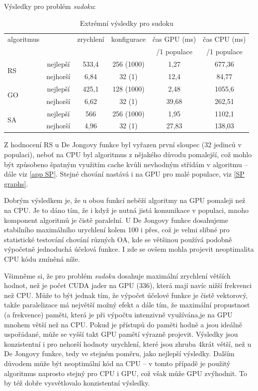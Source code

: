 Výsledky pro problém \emph{sudoku}:

\begin{table}[h]
    \begin{center}
    \begin{tabular}{lccccc}
      \toprule
      algoritmus &  & zrychlení & konfigurace & čas GPU (ms) & čas CPU (ms) \\
      & & & & /1 populace & /1 populace \\
      \midrule
      \multirow{2}{*}{RS} & nejlepší & 533,4 & 256 (1000) & 1,27 & 677,36\\
                        & nejhorší & 6,84 & 32 (1) & 12,4 & 84,77\\
      \multirow{2}{*}{GO} & nejlepší & 425,1 & 128 (1000) & 2,48 & 1055,6\\
                         & nejhorší & 6,62 & 32 (1) & 39,68 & 262,51 \\
      \multirow{2}{*}{SA} & nejlepší & 566 & 256 (1000) & 1,95 & 1102,1\\
                        & nejhorší & 4,96 & 32 (1) & 27,83 & 138,03\\

      \bottomrule
    \end{tabular}
    \caption{Extrémní výsledky pro sudoku}
    \end{center}
\end{table}

Z hodnocení RS u De Jongovy funkce byl vyřazen první sloupec (32 jedinců v populaci), neboť na CPU byl algoritmus z nějakého důvodu pomalejší, což mohlo být způsobeno špatným využitím cache kvůli nevhodným střídám v algoritmu -- dále viz \ref{app SP}. Stejné chování nastává i na GPU pro malé populace, viz \ref{SP graphs}.

Dobrým výsledkem je, že u obou funkcí neběží algoritmy na GPU pomaleji než na CPU. Je to dáno tím, že i když je nutná jistá komunikace v populaci, mnoho komponent algoritmů je čistě paralelní. U De Jongovy funkce dosahujeme stabilního maximálního urychlení kolem 100 i přes, což je velmi slibné pro statistické testování chování různých OA, kde se většinou používá podobně výpočetně jednoduchá účelová funkce. I zde se ovšem mohla projevit neoptimalita CPU kódu zmíněná níže. 

Všimněme si, že pro problém \emph{sudoku} dosahuje maximální zrychlení větších hodnot, než je počet CUDA jader na GPU (336), která mají navíc nižší frekvenci než CPU. Může to být jednak tím, že výpočet účelové funkce je čistě vektorový, takže paralelizace má největší možný efekt a dále tím, že maximální propustnost (a frekvence) paměti, která je při výpočtu intenzivně využívána,je na GPU mnohem větší než na CPU. Pokud je přístupů do paměti hodně a jsou ideálně uspořádané, může se vyšší takt GPU pamětí výrazně projevit. Výsledky jsou konzistentní i pro nehorší hodnoty urychlení, které jsou zhruba 4krát větší, než u De Jongovy funkce, tedy ve stejném poměru, jako nejlepší výsledky. Dalším důvodem může být neoptimální kód na CPU -- v tomto případě je použitý algoritmus naprosto stejný pro CPU i GPU, což však může GPU zvýhodnit. To by též dobře vysvětlovalo konzistentní výsledky.

